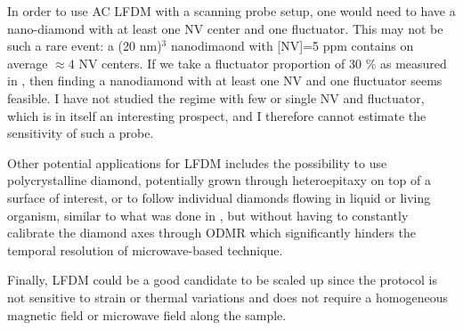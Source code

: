 \documentclass[a4paper,11pt]{report}
\begin{document}
\begin{refsection}
In order to use AC LFDM with a scanning probe setup, one would need to have a nano-diamond with at least one NV center and one fluctuator. This may not be such a rare event: a (20 nm)$^{3}$ nanodimaond with [NV]=5 ppm contains on average $\approx 4$ NV centers. If we take a fluctuator proportion of 30 \% as measured in \citep{choi2017depolarization}, then finding a nanodiamond with at least one NV and one fluctuator  seems feasible. I have not studied the regime with few or single NV and fluctuator, which is in itself an interesting prospect, and I therefore cannot estimate the sensitivity of such a probe. 

Other potential applications for LFDM includes the possibility to use polycrystalline diamond, potentially grown through heteroepitaxy on top of a surface of interest, or to follow individual diamonds flowing in liquid or living organism, similar to what was done in \citep{feng2021association}, but without having to constantly calibrate the diamond axes through ODMR which significantly hinders the temporal resolution of microwave-based technique.

Finally, LFDM could be a good candidate to be scaled up since the protocol is not sensitive to strain or thermal variations and does not require a homogeneous magnetic field or microwave field along the sample.


\printbibliography
\end{refsection}
 
\end{document}
